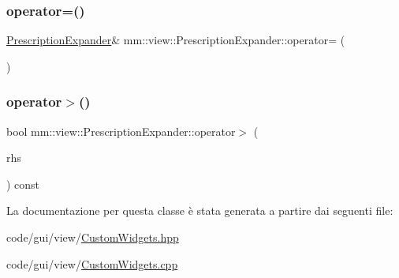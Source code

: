 \mbox{\label{classmm_1_1view_1_1_prescription_expander_a21d6e2894f4c17fc279510f4fadd8eff}} 
\subsubsection{\texorpdfstring{operator=()}{operator=()}}
{\footnotesize\ttfamily \mbox{\hyperlink{classmm_1_1view_1_1_prescription_expander}{Prescription\+Expander}}\& mm\+::view\+::\+Prescription\+Expander\+::operator= (\begin{DoxyParamCaption}\item[{\mbox{\hyperlink{classmm_1_1view_1_1_prescription_expander}{Prescription\+Expander}} \&}]{ }\end{DoxyParamCaption})\hspace{0.3cm}{\ttfamily [delete]}}

\mbox{\label{classmm_1_1view_1_1_prescription_expander_a3604c2f026067d71ff619036a9615694}} 
\subsubsection{\texorpdfstring{operator$>$()}{operator>()}}
{\footnotesize\ttfamily bool mm\+::view\+::\+Prescription\+Expander\+::operator$>$ (\begin{DoxyParamCaption}\item[{const \mbox{\hyperlink{classmm_1_1view_1_1_prescription_expander}{Prescription\+Expander}} \&}]{rhs }\end{DoxyParamCaption}) const\hspace{0.3cm}{\ttfamily [inline]}}



La documentazione per questa classe è stata generata a partire dai seguenti file\+:\begin{DoxyCompactItemize}
\item 
code/gui/view/\mbox{\hyperlink{_custom_widgets_8hpp}{Custom\+Widgets.\+hpp}}\item 
code/gui/view/\mbox{\hyperlink{_custom_widgets_8cpp}{Custom\+Widgets.\+cpp}}\end{DoxyCompactItemize}
